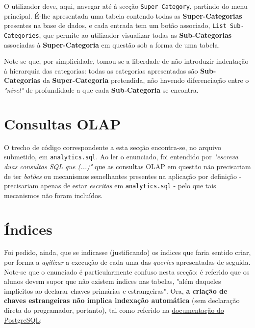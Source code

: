 \documentclass[12pt,a4paper]{article}
\begin{document}
\begin{enumerate}
        O utilizador deve, aqui, navegar até à secção \texttt{Super Category},
        partindo do menu principal. É-lhe apresentada uma tabela contendo todas as
        \textbf{Super-Categorias} presentes na base de dados, e cada entrada tem um
        botão associado, \texttt{List Sub-Categories}, que permite ao utilizador
        visualizar todas as \textbf{Sub-Categorias} associadas à \textbf{Super-Categoria}
        em questão sob a forma de uma tabela.

        Note-se que, por simplicidade, tomou-se a liberdade de não introduzir indentação
        à hierarquia das categorias: todas as categorias apresentadas são
        \textbf{Sub-Categorias} da \textbf{Super-Categoria} pretendida, não havendo diferenciação
        entre o \textit{"nível"} de profundidade a que cada \textbf{Sub-Categoria} se encontra.

\end{enumerate}


\section*{Consultas OLAP}

O trecho de código correspondente a esta secção encontra-se, no arquivo submetido,
em \texttt{analytics.sql}. Ao ler o enunciado, foi entendido por \textit{"escreva
  duas consultas SQL que (...)"} que as consultas OLAP em questão não precisariam
de ter \textit{botões} ou mecanismos semelhantes presentes na aplicação por
definição - precisariam apenas de estar \textit{escritas} em \texttt{analytics.sql} -
pelo que tais mecanismos não foram incluídos.

\section*{Índices}

Foi pedido, ainda, que se indicasse (justificando) os índices que faria sentido
criar, por forma a \textit{agilizar} a execução de cada uma das \textit{queries}
apresentadas de seguida. Note-se que o enunciado é particularmente confuso nesta
secção: é referido que os alunos devem supor que não existem índices nas tabelas,
"além daqueles implícitos ao declarar chaves primárias e estrangeiras". Ora, \textbf{a
  criação de chaves estrangeiras não implica indexação automática} (sem declaração
direta do programador, portanto), tal como referido na
\href{https://www.postgresql.org/docs/current/ddl-constraints.html#DDL-CONSTRAINTS-FK}
{documentação do PostgreSQL}:
\end{document}
